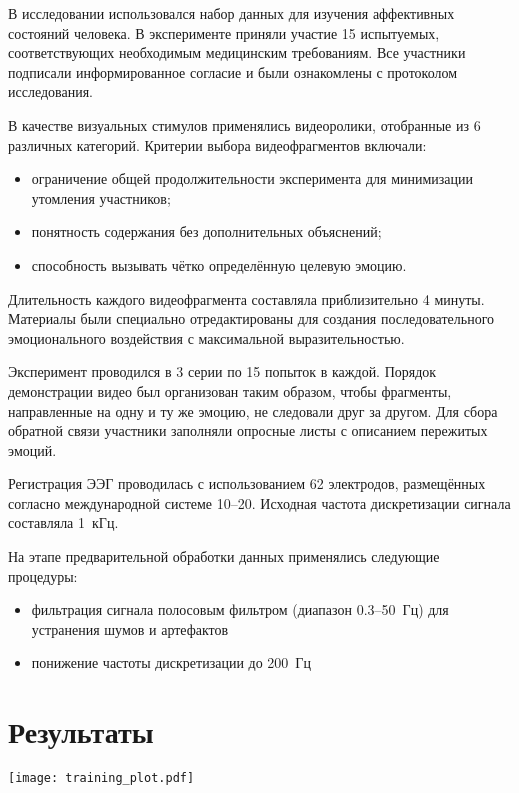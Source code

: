 \documentclass[12pt, twoside]{article}
\begin{document}
В исследовании использовался набор данных \cite{Dataset} для изучения аффективных состояний человека. В эксперименте приняли участие 15 испытуемых, соответствующих необходимым медицинским требованиям. Все участники подписали информированное согласие и были ознакомлены с протоколом исследования.

В качестве визуальных стимулов применялись видеоролики, отобранные из 6 различных категорий. Критерии выбора видеофрагментов включали:
\begin{itemize}
    \item ограничение общей продолжительности эксперимента для минимизации утомления участников;
    \item понятность содержания без дополнительных объяснений;
    \item способность вызывать чётко определённую целевую эмоцию.
\end{itemize}

Длительность каждого видеофрагмента составляла приблизительно 4 минуты. Материалы были специально отредактированы для создания последовательного эмоционального воздействия с максимальной выразительностью.

Эксперимент проводился в 3 серии по 15 попыток в каждой. Порядок демонстрации видео был организован таким образом, чтобы фрагменты, направленные на одну и ту же эмоцию, не следовали друг за другом. Для сбора обратной связи участники заполняли опросные листы с описанием пережитых эмоций.

Регистрация ЭЭГ проводилась с использованием 62 электродов, размещённых согласно международной системе 10--20. Исходная частота дискретизации сигнала составляла 1~кГц. 

На этапе предварительной обработки данных применялись следующие процедуры:
\begin{itemize}
    \item фильтрация сигнала полосовым фильтром (диапазон 0.3--50~Гц) для устранения шумов и артефактов
    \item понижение частоты дискретизации до 200~Гц
\end{itemize}

\section{Результаты}


\begin{center}
\texttt{[image: training\_plot.pdf]}
\end{center}
\end{document}
